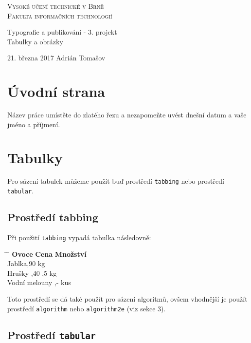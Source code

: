 \documentclass[a4paper, 11pt]{article}
\begin{document}
\begin{center}
\thispagestyle{empty}
\Huge
\textsc{Vysoké učení technické v Brně\\
\huge Fakulta informačních technologií\\}

\LARGE Typografie a publikování - 3. projekt\\
\Huge Tabulky a obrázky
\end{center}
{\LARGE 21. března 2017 \hfill Adrián Tomašov}
\pagebreak

\setcounter{page}{1}


\section{Úvodní strana}
Název práce umístěte do zlatého řezu a nezapomeňte uvést dnešní datum a vaše jméno a příjmení.

\section{Tabulky}
Pro sázení tabulek můžeme použít buď prostředí \verb!tabbing! nebo prostředí \verb!tabular!.

\subsection{Prostředí tabbing}
Při použití \verb!tabbing! vypadá tabulka následovně:
\begin{tabbing}
	{\quad}{\quad}{\quad}{\quad}{\quad}{\quad}{\quad}\= {\quad}{\quad}{\quad} \= \kill
	\textbf{Ovoce} \> \textbf{Cena} \> \textbf{Množství}\\
	Jablka,90  kg\\
	Hrušky ,40 ,5 kg \\
	Vodní melouny ,-  kus\\

\end{tabbing}

\noindent Toto prostředí se dá také použít pro sázení algoritmů, ovšem vhodnější je použít prostředí \verb!algorithm! nebo \verb!algorithm2e! (viz sekce 3).


\subsection{Prostředí {\tt \textbf{tabular}}}
\end{document}
